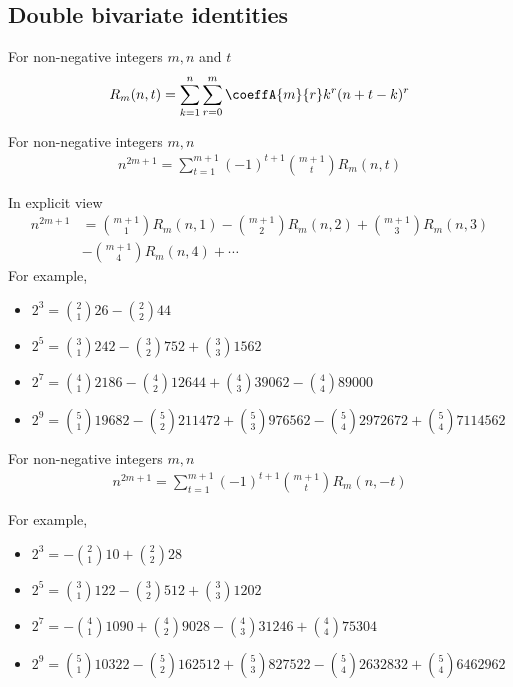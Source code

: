 \subsection{Double bivariate identities}\label{subsec:double-bivariate-identities}
\begin{definition}
    For non-negative integers $m,n$ and $t$
    \begin{align*}
        R_{m}(n,t) = \sum_{k=1}^{n} \sum_{r=0}^{m} \coeffA{m}{r} k^r (n+t-k)^r
    \end{align*}
\end{definition}
\begin{proposition}
    For non-negative integers $m,n$
    \begin{align*}
        n^{2m+1} = \sum_{t=1}^{m+1} (-1)^{t+1} \binom{m+1}{t} R_{m} (n, t)
    \end{align*}
\end{proposition}
In explicit view
\begin{align*}
    n^{2m+1}
    &=  \binom{m+1}{1} R_{m} (n, 1) - \binom{m+1}{2} R_{m} (n, 2) + \binom{m+1}{3} R_{m} (n, 3) \\
    &- \binom{m+1}{4} R_{m} (n, 4) + \cdots
\end{align*}
For example,
\begin{itemize}
    \item $2^3 = \binom{2}{1} 26 - \binom{2}{2} 44$
    \item $2^5 = \binom{3}{1} 242 - \binom{3}{2} 752 + \binom{3}{3} 1562$
    \item $2^7 = \binom{4}{1} 2186 - \binom{4}{2} 12644 + \binom{4}{3} 39062 - \binom{4}{4} 89000$
    \item $2^9 = \binom{5}{1} 19682 - \binom{5}{2} 211472 + \binom{5}{3} 976562 - \binom{5}{4} 2972672 + \binom{5}{4} 7114562$
\end{itemize}
\begin{proposition}
    For non-negative integers $m,n$
    \begin{align*}
        n^{2m+1} = \sum_{t=1}^{m+1} (-1)^{t+1} \binom{m+1}{t} R_{m} (n, -t)
    \end{align*}
\end{proposition}
For example,
\begin{itemize}
    \item $2^3 = -\binom{2}{1}10 + \binom{2}{2} 28$
    \item $2^5 = \binom{3}{1} 122 - \binom{3}{2} 512 + \binom{3}{3} 1202$
    \item $2^7 = -\binom{4}{1} 1090 + \binom{4}{2} 9028 - \binom{4}{3} 31246 + \binom{4}{4} 75304$
    \item $2^9 = \binom{5}{1} 10322 - \binom{5}{2} 162512 + \binom{5}{3} 827522 - \binom{5}{4} 2632832 + \binom{5}{4} 6462962$
\end{itemize}
